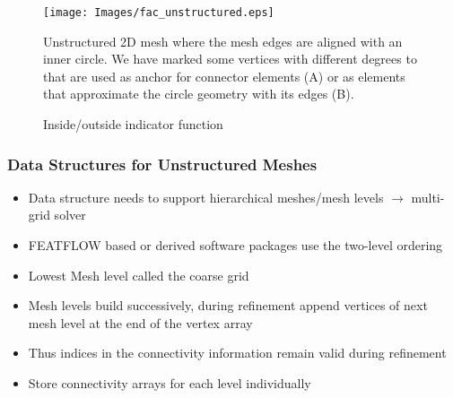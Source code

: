 \begin{frame}
\begin{figure}[h!]
\begin{center}
\texttt{[image: Images/fac\_unstructured.eps]}
\end{center}
\caption{Unstructured 2D mesh where the mesh edges are aligned with an inner circle. We have marked some vertices with different 
degrees to that are used as anchor for connector elements (A) or as elements that approximate the circle geometry with its edges (B).}
\label{fig:unstructured-fac}
\end{figure}
\end{frame}

\begin{frame}
\begin{figure}[h!]
  \centering
  \caption{Inside/outside indicator function}
  \label{fig:camaro-mesh}
\end{figure}
\end{frame}

\begin{frame}
\frametitle{Data Structures for Unstructured Meshes}
\begin{itemize}
\item Data structure needs to support hierarchical meshes/mesh levels $\rightarrow$ multi-grid solver
\item FEATFLOW based or derived software packages use the two-level ordering
\item Lowest Mesh level called the coarse grid
\item Mesh levels build successively, during refinement append vertices of next mesh level at the end of the vertex array
\item Thus indices in the connectivity information remain valid during refinement
\item Store connectivity arrays for each level individually
\end{itemize}
\end{frame}

